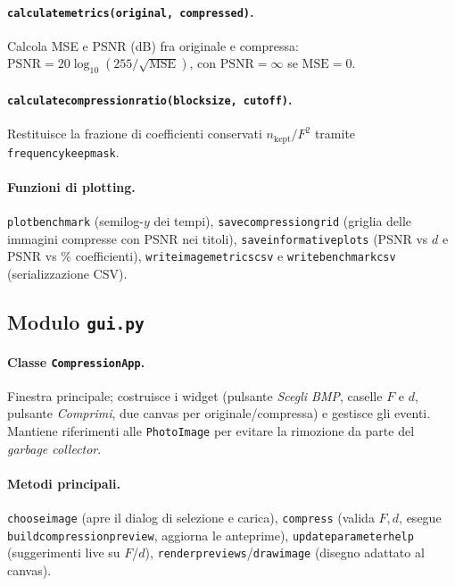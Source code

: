 \documentclass[11pt,a4paper]{article}
\makeatletter
\let\@origtexttt\texttt
\renewcommand{\texttt}[1]{{\def\_{\textunderscore\discretionary{}{}{}}\@origtexttt{#1}}}
\makeatother
\begin{document}
\paragraph{\texttt{calculate\_metrics(original, compressed)}.}
Calcola MSE e PSNR (dB) fra originale e compressa:
$\mathrm{PSNR}=20\log_{10}(255/\sqrt{\mathrm{MSE}})$, con $\mathrm{PSNR}=\infty$
se $\mathrm{MSE}=0$.

\paragraph{\texttt{calculate\_compression\_ratio(block\_size, cutoff)}.}
Restituisce la frazione di coefficienti conservati
$n_{\text{kept}}/F^2$ tramite \texttt{frequency\_keep\_mask}.

\paragraph{Funzioni di plotting.}
\texttt{plot\_benchmark} (semilog-$y$ dei tempi), \texttt{save\_compression\_grid}
(griglia delle immagini compresse con PSNR nei titoli),
\texttt{save\_informative\_plots} (PSNR vs $d$ e PSNR vs \% coefficienti),
\texttt{write\_image\_metrics\_csv} e \texttt{write\_benchmark\_csv}
(serializzazione CSV).

\subsection{Modulo \texttt{gui.py}}

\paragraph{Classe \texttt{CompressionApp}.}
Finestra principale; costruisce i widget (pulsante \emph{Scegli BMP}, caselle
$F$ e $d$, pulsante \emph{Comprimi}, due canvas per originale/compressa) e gestisce
gli eventi. Mantiene riferimenti alle \texttt{PhotoImage} per evitare la
rimozione da parte del \emph{garbage collector}.

\paragraph{Metodi principali.}
\texttt{choose\_image} (apre il dialog di selezione e carica),
\texttt{compress} (valida $F,d$, esegue \texttt{build\_compression\_preview},
aggiorna le anteprime), \texttt{update\_parameter\_help} (suggerimenti live su
$F$/$d$), \texttt{render\_previews}/\texttt{draw\_image} (disegno adattato al
canvas).
\end{document}

